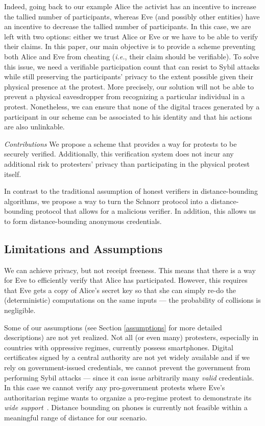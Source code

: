 Indeed, going back to our example Alice the activist has an incentive to increase the tallied number of participants, whereas Eve (and possibly other entities) have an incentive to decrease the tallied number of participants.
In this case, we are left with two options: either we trust Alice or Eve or we have to be able to verify their claims.
In this paper, our main objective is to provide a scheme preventing both Alice and Eve from cheating (\emph{i.e.}, their claim should be verifiable).
To solve this issue, we need a verifiable participation count that can resist to Sybil attacks while still preserving the participants'
privacy to the extent possible given their physical presence at the protest. 
More precisely, our solution will not be able to prevent a physical eavesdropper from recognizing a particular individual in a protest. 
Nonetheless, we can ensure that none of the digital traces generated by a participant in our scheme can be associated to his identity and that his actions are also unlinkable.

\emph{Contributions} We propose a scheme that provides a way for protests to be securely verified.
Additionally, this verification system does not incur any additional risk to 
protesters' privacy than participating in the physical protest itself.

In contrast to the traditional assumption of honest verifiers in
distance-bounding algorithms, we propose a way to turn the Schnorr
protocol into a distance-bounding protocol that allows for a malicious
verifier. In addition, this allows us to form distance-bounding
anonymous credentials.

\subsection{Limitations and Assumptions}

We can achieve privacy, but not receipt freeness.
This means that there is a way for Eve to efficiently verify that Alice has 
participated.
However, this requires that Eve gets a copy of Alice's secret key so that she 
can simply re-do the (deterministic) computations on the same inputs --- the 
probability of collisions is negligible.


Some of our assumptions (see Section \ref{assumptions} for more
detailed descriptions) are not yet
realized. Not all (or even many) protesters, especially in countries
with oppressive regimes, currently possess smartphones. Digital
certificates signed by a central authority are not yet widely
available and if we rely on government-issued credentials, we cannot prevent the government 
from performing Sybil attacks --- since it can issue arbitrarily many 
\emph{valid} credentials. In this case we cannot verify any pro-government protests where Eve's authoritarian regime wants to organize a pro-regime protest to 
demonstrate its \emph{wide 
  support}~\cite[e.g.][]{AlJazeeraOnVenezuela2017,VenezuelanStateWorkersCalledToParticipate}.
Distance bounding on phones is currently not feasible within a
meaningful range of distance for our scenario. 

